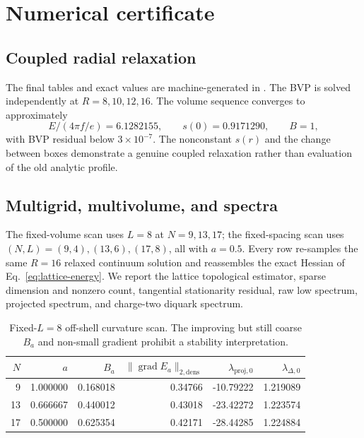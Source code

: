 \documentclass[11pt]{article}
\theoremstyle{definition}
\theoremstyle{remark}
\begin{document}
\section{Numerical certificate}

\subsection{Coupled radial relaxation}

The final tables and exact values are machine-generated in
.  The BVP is
solved independently at \(R=8,10,12,16\).  The volume sequence converges to
approximately
\begin{equation}
 E/(4\pi f/e)=6.1282155,\qquad s(0)=0.9171290,\qquad B=1,
 \end{equation}
with BVP residual below \(3\times10^{-7}\).  The nonconstant \(s(r)\) and
the change between boxes demonstrate a genuine coupled relaxation rather
than evaluation of the old analytic profile.

\subsection{Multigrid, multivolume, and spectra}

The fixed-volume scan uses \(L=8\) at \(N=9,13,17\); the fixed-spacing scan
uses \((N,L)=(9,4),(13,6),(17,8)\), all with \(a=0.5\).  Every row
re-samples the same \(R=16\) relaxed continuum solution and reassembles the
exact Hessian of Eq.~\eqref{eq:lattice-energy}.  We report the lattice
topological estimator, sparse dimension and nonzero count, tangential
stationarity residual, raw low spectrum, projected spectrum, and charge-two
diquark spectrum.

\begin{table}[ht]
\centering
\small
\begin{tabular}{rrrrrr}
\toprule
\(N\)&\(a\)&\(B_a\)&
\(\|\operatorname{grad}E_a\|_{2,\mathrm{dens}}\)&
\(\lambda_{\mathrm{proj},0}\)&\(\lambda_{\Delta,0}\)\\
\midrule
9&1.000000&0.168018&0.34766&-10.79222&1.219089\\
13&0.666667&0.440012&0.43018&-23.42272&1.223574\\
17&0.500000&0.625354&0.42171&-28.44285&1.224884\\
\bottomrule
\end{tabular}
\caption{Fixed-\(L=8\) off-shell curvature scan.  The improving but still
coarse \(B_a\) and non-small gradient prohibit a stability interpretation.}
\label{tab:grid}
\end{table}
\end{document}
